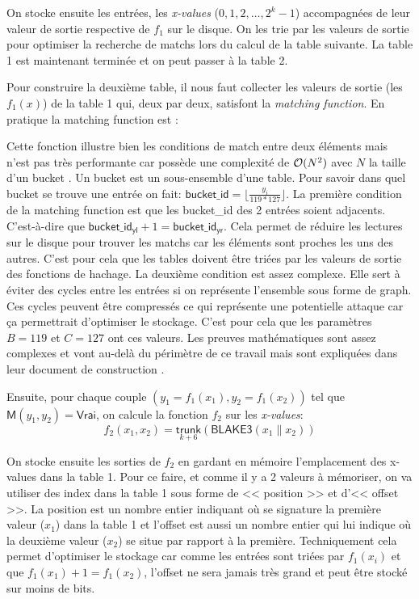 On stocke ensuite les entrées, les \emph{x-values} ($0,1,2,\dots,2^k-1$) accompagnées de leur valeur de sortie respective de $f_1$ sur le disque. On les trie par les valeurs de sortie pour optimiser la recherche de matchs lors du calcul de la table suivante. La table 1 est maintenant terminée et on peut passer à la table 2.

Pour construire la deuxième table, il nous faut collecter les valeurs de sortie (les $f_1(x)$) de la table 1 qui, deux par deux, satisfont la \emph{matching function}. En pratique la matching function est :


Cette fonction illustre bien les conditions de match entre deux éléments mais n'est pas très performante car possède une complexité de $\mathcal{O}(N^2)$ avec $N$ la taille d'un bucket \cite{chiapos}. Un bucket est un sous-ensemble d'une table. Pour savoir dans quel bucket se trouve une entrée on fait: $\mathsf{bucket\_id} = \lfloor\frac{y_i}{119 * 127}\rfloor$. La première condition de la matching function est que les bucket\_id des 2 entrées soient adjacents. C'est-à-dire que $\mathsf{bucket\_id_{yl}} + 1 = \mathsf{bucket\_id_{yr}}$. Cela permet de réduire les lectures sur le disque pour trouver les matchs car les éléments sont proches les uns des autres. C'est pour cela que les tables doivent être triées par les valeurs de sortie des fonctions de hachage. La deuxième condition est assez complexe. Elle sert à éviter des cycles entre les entrées si on représente l'ensemble sous forme de graph. Ces cycles peuvent être compressés ce qui représente une potentielle attaque car ça permettrait d'optimiser le stockage. C'est pour cela que les paramètres $B = 119$ et $C = 127$ ont ces valeurs. Les preuves mathématiques sont assez complexes et vont au-delà du périmètre de ce travail mais sont expliquées dans leur document de construction \cite{chia:construction}.

Ensuite, pour chaque couple $(y_1=f_1(x_1), y_2=f_1(x_2))$ tel que $\textsf{M}(y_1, y_2) = \textsf{Vrai}$, on calcule la fonction $f_2$ sur les \emph{x-values}:
\begin{equation*}
  f_2(x_1,x_2) = \underset{k + 6}{\textsf{trunk}}(\textsf{BLAKE3}(x_1\|x_2))
\end{equation*}

On stocke ensuite les sorties de $f_2$ en gardant en mémoire l'emplacement des x-values dans la table 1. Pour ce faire, et comme il y a 2 valeurs à mémoriser, on va utiliser des index dans la table 1 sous forme de << position >> et d'<< offset >>. La position est un nombre entier indiquant où se signature la première valeur ($x_1$) dans la table 1 et l'offset est aussi un nombre entier qui lui indique où la deuxième valeur ($x_2$) se situe par rapport à la première. Techniquement cela permet d'optimiser le stockage car comme les entrées sont triées par $f_1(x_i)$ et que $f_1(x_1) + 1 = f_1(x_2)$, l'offset ne sera jamais très grand et peut être stocké sur moins de bits. 

